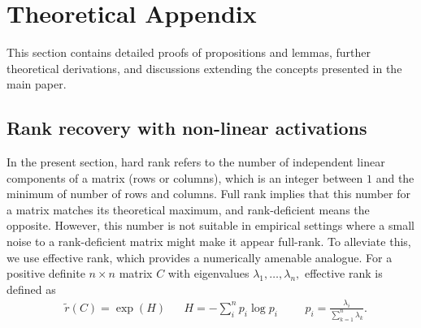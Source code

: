 \documentclass{article}
\numberwithin{figure}{section}
\begin{document}





\appendix

\section{Theoretical Appendix}
% 
\label{app:theory_appendix}
This section contains detailed proofs of propositions and lemmas, further theoretical derivations, and discussions extending the concepts presented in the main paper. 

\subsection{Rank recovery with non-linear activations}

In the present section, hard rank refers to the number of independent linear components of a matrix (rows or columns), which is an integer between $1$ and the minimum of number of rows and columns. Full rank implies that this number for a matrix matches its theoretical maximum, and rank-deficient means the opposite. However, this number is not suitable in empirical settings where a small noise to a rank-deficient matrix might make it appear full-rank. To alleviate this, we use effective rank, which provides a numerically amenable analogue. For a positive definite $n\times n$ matrix $C$ with eigenvalues $\lambda_1,\dots, \lambda_n,$ effective rank is defined as 
\begin{align*}
&\tilde{r}(C)= \exp(H) &&H =-\sum_i^n p_i\log p_i &&&  p_i = \frac{\lambda_i}{\sum_{k=1}^n \lambda_k}.
\end{align*}
\end{document}
